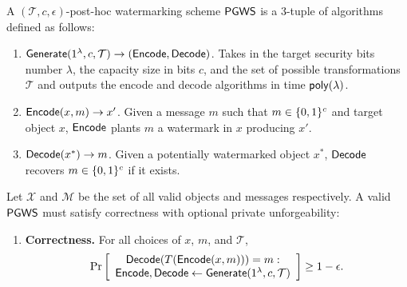 \documentclass[12pt]{article}
\begin{document}
\begin{definition}

A $(\mathcal{T}, c, \epsilon)$-post-hoc watermarking scheme $\mathsf{PGWS}$ is a 3-tuple of algorithms defined as follows:

\begin{enumerate}
    \item $\mathsf{Generate}(1^\lambda, c, \mathcal{T}) \to (\mathsf{Encode}, \mathsf{Decode})$. Takes in the target security bits number $\lambda$, the capacity size in bits $c$, and the set of possible transformations $\mathcal{T}$ and outputs the encode and decode algorithms in time $\mathsf{poly}(\lambda)$.
    
    \item $\mathsf{Encode}(x, m) \to x'$. Given a message $m$ such that $m \in \{0,1\}^c$ and target object $x$, $\mathsf{Encode}$ plants $m$ a watermark in $x$ producing $x'$.
    
    \item $\mathsf{Decode}(x^*) \to m$. Given a potentially watermarked object $x^*$, $\mathsf{Decode}$ recovers $m \in \{0,1\}^c$ if it exists.
\end{enumerate}

Let $\mathcal{X}$ and $\mathcal{M}$ be the set of all valid objects and messages respectively.
A valid $\mathsf{PGWS}$ must satisfy correctness with optional private unforgeability:

\begin{enumerate}
    \item \textbf{Correctness.} For all choices of $x$,  $m$, and $\mathcal{T}$,
    \begin{align*}
        \Pr\left[
        \begin{array}{ccc}
            \begin{matrix}
                \mathsf{Decode}(T(\mathsf{Encode}(x, m))) = m: \\
                \mathsf{Encode}, \mathsf{Decode} \gets \mathsf{Generate}(1^\lambda, c, \mathcal{T}) \\
            \end{matrix} \\
        \end{array}
        \right] \geq 1 - \epsilon.
    \end{align*}
    

\end{enumerate}
\end{definition}
\end{document}
